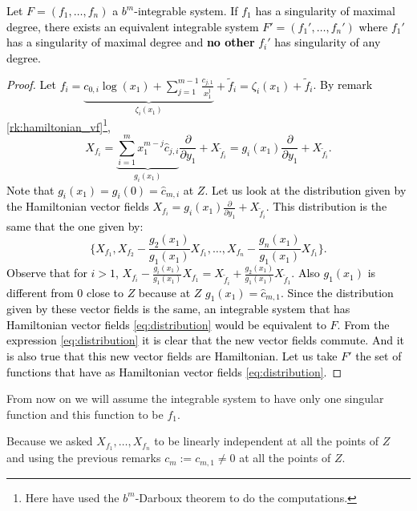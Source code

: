 \textcolor{black}{
\begin{lemma}
Let $F = (f_1,\ldots,f_n)$ a $b^m$-integrable system. If $f_1$ has a singularity of maximal degree, there exists an equivalent integrable system $F' = (f_1',\ldots,f_n')$ where $f_1'$ has a singularity of maximal degree and \textbf{no other} $f_i'$ has singularity of any degree.
\end{lemma}
\begin{proof}
Let $f_i = \underbrace{c_{0,i}\log(x_1) + \sum_{j=1}^{m-1}\frac{c_{j,1}}{x_1^j}}_{\zeta_i(x_1)} + \tilde f_i = \zeta_i(x_1) + \tilde f _i$.
By remark \ref{rk:hamiltonian_vf}\footnote{Here have used the $b^m$-Darboux theorem to do the computations.},
$$X_{f_i} = \underbrace{\sum_{i=1}^{m} x_1^{m-j} \hat c_{j,i}}_{g_i(x_1)}\frac{\partial}{\partial y_1} + X_{\tilde f_i} = g_i(x_1)\frac{\partial}{\partial y_1} + X_{\tilde f_i}.$$
Note that $g_i(x_1) = g_i(0) = \hat c_{m,i}$ at $Z$. Let us look at the distribution given by the Hamiltonian vector fields $X_{f_i} = g_i(x_1)\frac{\partial}{\partial y_1} + X_{\tilde f_i}$. This distribution is the same that the one given by:
\begin{equation}\label{eq:distribution}
\{X_{f_1}, X_{f_2} - \frac{g_2(x_1)}{g_1(x_1)} X_{f_1},\ldots, X_{f_n} - \frac{g_n(x_1)}{g_1(x_1)} X_{f_1}\}.
\end{equation}
Observe that for $i > 1$, $X_{f_i} - \frac{g_i(x_1)}{g_1(x_1)} X_{f_1} = X_{\tilde f_i} + \frac{g_2(x_1)}{g_1(x_1)} X_{\tilde f_1}$. Also $g_1(x_1)$ is different from $0$ close to $Z$ because at $Z$ $g_1(x_1) = \hat c_{m,1}$.
Since the distribution given by these vector fields is the same, an integrable system that has Hamiltonian vector fields \ref{eq:distribution} would be equivalent to $F$. From the expression \ref{eq:distribution} it is clear that the new vector fields commute. And it is also true that this new vector fields are Hamiltonian. Let us take $F'$ the set of functions that have as Hamiltonian vector fields \ref{eq:distribution}.
\end{proof}
}

From now on we will assume the integrable system to have only one singular function and this function to be $f_1$.

\begin{remark}
Because we asked  $X_{f_1},\ldots,X_{f_n}$ to be linearly independent at all the points of $Z$ and using the previous remarks  $c_m := c_{m,1} \neq 0$ at all the points of $Z$.
\end{remark}


